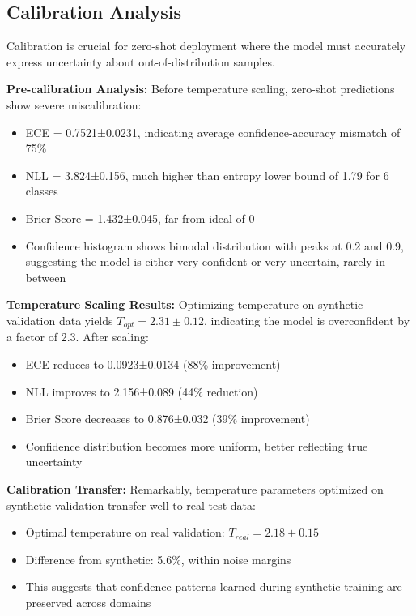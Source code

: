 \documentclass[journal]{IEEEtran}
\begin{document}
\subsection{Calibration Analysis}
Calibration is crucial for zero-shot deployment where the model must accurately express uncertainty about out-of-distribution samples.

\textbf{Pre-calibration Analysis:} Before temperature scaling, zero-shot predictions show severe miscalibration:
\begin{itemize}
\item ECE = 0.7521±0.0231, indicating average confidence-accuracy mismatch of 75\%
\item NLL = 3.824±0.156, much higher than entropy lower bound of 1.79 for 6 classes
\item Brier Score = 1.432±0.045, far from ideal of 0
\item Confidence histogram shows bimodal distribution with peaks at 0.2 and 0.9, suggesting the model is either very confident or very uncertain, rarely in between
\end{itemize}

\textbf{Temperature Scaling Results:} Optimizing temperature on synthetic validation data yields $T_{opt} = 2.31±0.12$, indicating the model is overconfident by a factor of 2.3. After scaling:
\begin{itemize}
\item ECE reduces to 0.0923±0.0134 (88\% improvement)
\item NLL improves to 2.156±0.089 (44\% reduction)
\item Brier Score decreases to 0.876±0.032 (39\% improvement)
\item Confidence distribution becomes more uniform, better reflecting true uncertainty
\end{itemize}

\textbf{Calibration Transfer:} Remarkably, temperature parameters optimized on synthetic validation transfer well to real test data:
\begin{itemize}
\item Optimal temperature on real validation: $T_{real} = 2.18±0.15$
\item Difference from synthetic: 5.6\%, within noise margins
\item This suggests that confidence patterns learned during synthetic training are preserved across domains
\end{itemize}
\end{document}
